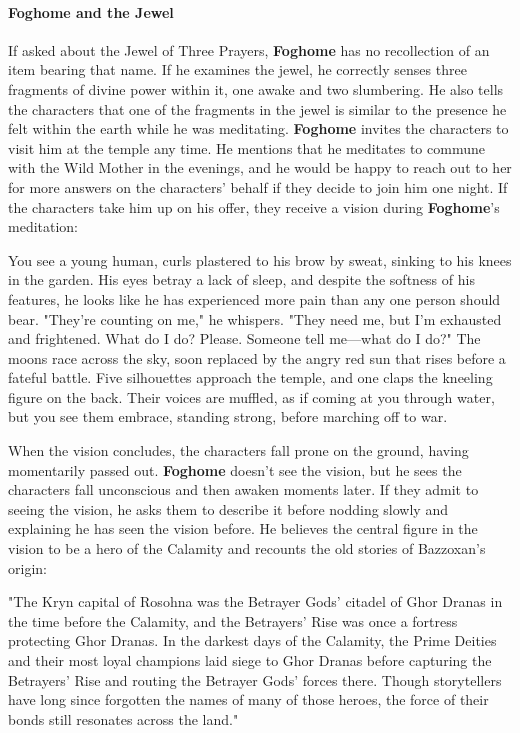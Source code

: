 \documentclass[10pt,a4,twoside,twocolumn,openany,nodeprecatedcode]{dndbook}
\begin{document}
\paragraph{Foghome and the Jewel}
If asked about the Jewel of Three Prayers, \textbf{Foghome} has no recollection of an item bearing that name. If he examines the jewel, he correctly senses three fragments of divine power within it, one awake and two slumbering. He also tells the characters that one of the fragments in the jewel is similar to the presence he felt within the earth while he was meditating.
\textbf{Foghome} invites the characters to visit him at the temple any time. He mentions that he meditates to commune with the Wild Mother in the evenings, and he would be happy to reach out to her for more answers on the characters' behalf if they decide to join him one night.
If the characters take him up on his offer, they receive a vision during \textbf{Foghome}'s meditation:
\begin{DndReadAloud}{}
You see a young human, curls plastered to his brow by sweat, sinking to his knees in the garden. His eyes betray a lack of sleep, and despite the softness of his features, he looks like he has experienced more pain than any one person should bear. "They're counting on me," he whispers. "They need me, but I'm exhausted and frightened. What do I do? Please. Someone tell me—what do I do?"
The moons race across the sky, soon replaced by the angry red sun that rises before a fateful battle. Five silhouettes approach the temple, and one claps the kneeling figure on the back. Their voices are muffled, as if coming at you through water, but you see them embrace, standing strong, before marching off to war.
\end{DndReadAloud}

When the vision concludes, the characters fall prone on the ground, having momentarily passed out. \textbf{Foghome} doesn't see the vision, but he sees the characters fall unconscious and then awaken moments later. If they admit to seeing the vision, he asks them to describe it before nodding slowly and explaining he has seen the vision before. He believes the central figure in the vision to be a hero of the Calamity and recounts the old stories of Bazzoxan's origin:
\begin{DndReadAloud}{}
"The Kryn capital of Rosohna was the Betrayer Gods' citadel of Ghor Dranas in the time before the Calamity, and the Betrayers' Rise was once a fortress protecting Ghor Dranas. In the darkest days of the Calamity, the Prime Deities and their most loyal champions laid siege to Ghor Dranas before capturing the Betrayers' Rise and routing the Betrayer Gods' forces there. Though storytellers have long since forgotten the names of many of those heroes, the force of their bonds still resonates across the land."
\end{DndReadAloud}
\end{document}
